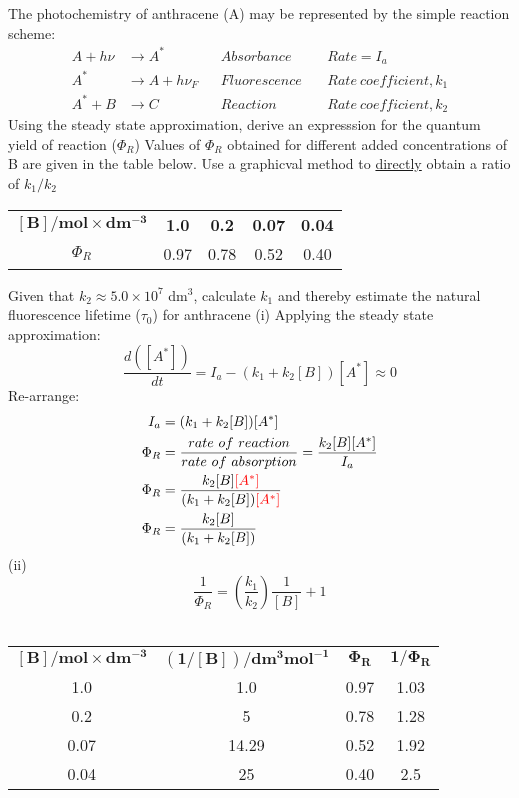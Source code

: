 \documentclass[ignorenonframetext]{beamer}
\begin{document}
\begin{ExerciseList}
\Exercise The photochemistry of anthracene (A) may be represented by the simple reaction scheme:
\begin{align*}
A + h\nu &\rightarrow A^*	&	&Absorbance\	& &Rate = I_a\\
A^* &\rightarrow A + h\nu_F 	&	&Fluorescence\	&		&Rate\ coefficient, k_1\\
A^* + B &\rightarrow C &	 &Reaction\	&	&Rate\ coefficient, k_2
\end{align*}
\Question Using the steady state approximation, derive an expresssion for the quantum yield of reaction (\(\Phi_R\))
\Question Values of \(\Phi_R\) obtained for different added concentrations of B are given in the table below. Use a graphicval method to \underline{directly} obtain a ratio of \(k_1/k_2\)
\begin{tabular}{ccccc}
\(\mathbf{[B]/mol\times dm^{-3}}\) & \textbf{1.0} & \textbf{0.2} & \textbf{0.07} & \textbf{0.04}\\
\(\Phi_R\) & 0.97 & 0.78 & 0.52 & 0.40
\end{tabular}

\Question Given that \(k_2 \approx 5.0\times10^7\) dm\(^3\), calculate \(k_1\) and thereby estimate the natural fluorescence lifetime (\(\tau_0\)) for anthracene
\Answer 
(i) Applying the steady state approximation:\\
\[\frac{d([A^*])}{dt} = I_a - (k_1 + k_2[B])[A^*] \approx 0\]
Re-arrange:
\begin{align*}
I_a &= (k_1 + k_2[B])[A^*]\\
\Phi_R &= \frac{rate\ of\ reaction}{rate\ of\ absorption} = \frac{k_2[B][A^*]}{I_a}\\
\Phi_R &= \frac{k_2[B]\textcolor{red}{[A^*]}}{(k_1 + k_2[B])\textcolor{red}{[A^*]}}\\
\Phi_R &= \frac{k_2[B]}{(k_1 + k_2[B])}
\end{align*}
(ii) \[ \frac{1}{\Phi_R} = \left(\frac{k_1}{k_2}\right)\frac{1}{[B]} + 1\]\\
\begin{tabular}{cccc}
\(\mathbf{[B]/mol\times dm^{-3}}\) & \(\mathbf{(1/[B])/dm^3mol^{-1}}\) & \(\mathbf{\Phi_R}\) & \(\mathbf{1/\Phi_R}\)\\
1.0 & 1.0 & 0.97 & 1.03\\
0.2 & 5 & 0.78 & 1.28\\
0.07 & 14.29 & 0.52 & 1.92\\
0.04 & 25 & 0.40 & 2.5\\
\end{tabular}


\end{ExerciseList}
\end{document}
